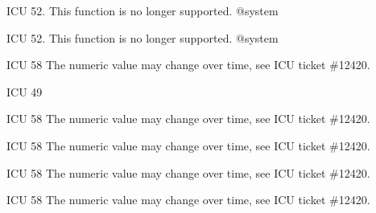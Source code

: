 \begin{DoxyRefList}
%
I\+CU 52. This function is no longer supported. @system  
\item[Member \mbox{\hyperlink{uclean_8h_af98d47f02b5ed1a25f662081076126c2}{u\+\_\+set\+Mutex\+Functions}} (const void $\ast$context, U\+Mtx\+Init\+Fn $\ast$init, U\+Mtx\+Fn $\ast$destroy, U\+Mtx\+Fn $\ast$lock, U\+Mtx\+Fn $\ast$unlock, U\+Error\+Code $\ast$status)]\label{deprecated__deprecated000035}%
%
I\+CU 52. This function is no longer supported. @system  
\item[Member \mbox{\hyperlink{utypes_8h_a3343c1c8a8377277046774691c98d78cac95be10a0360afc8388874d592bd4074}{U\+\_\+\+S\+T\+A\+N\+D\+A\+R\+D\+\_\+\+E\+R\+R\+O\+R\+\_\+\+L\+I\+M\+IT}} ]\label{deprecated__deprecated000232}%
%
I\+CU 58 The numeric value may change over time, see I\+CU ticket \#12420.  
\item[Member \mbox{\hyperlink{uchar_8h_a2ba37edcca62eff48226e8096035addfa3bbcfaa5c84064aab103a6201581736b}{U\+\_\+\+U\+N\+I\+C\+O\+D\+E\+\_\+10\+\_\+\+C\+H\+A\+R\+\_\+\+N\+A\+ME}} ]\label{deprecated__deprecated000020}%
%
I\+CU 49  
\item[Member \mbox{\hyperlink{uchar_8h_af70ee907368e663f8dd4b90c7196e15ca72f3d829d094754a620746892c46c717}{U\+\_\+\+W\+B\+\_\+\+C\+O\+U\+NT}} ]\label{deprecated__deprecated000027}%
%
I\+CU 58 The numeric value may change over time, see I\+CU ticket \#12420.  
\item[Member \mbox{\hyperlink{ubidi_8h_a88693e5a8ad4be974dc90ec6b8db56dfae19ca6f8614a91e49454b21264f6a379}{U\+B\+I\+D\+I\+\_\+\+R\+E\+O\+R\+D\+E\+R\+\_\+\+C\+O\+U\+NT}} ]\label{deprecated__deprecated000002}%
%
I\+CU 58 The numeric value may change over time, see I\+CU ticket \#12420.  
\item[Member \mbox{\hyperlink{uchar_8h_a19f1662c9c33c31593612d05777ea901a04e4577a8946c1c6b032ee1a17728eff}{U\+B\+L\+O\+C\+K\+\_\+\+C\+O\+U\+NT}} ]\label{deprecated__deprecated000018}%
%
I\+CU 58 The numeric value may change over time, see I\+CU ticket \#12420.  
\item[Member \mbox{\hyperlink{ubrk_8h_a026dec40289da8261d787daf3baa588ba6040742b07566e5e3655d4843efaefac}{U\+B\+R\+K\+\_\+\+C\+O\+U\+NT}} ]\label{deprecated__deprecated000006}%
%
I\+CU 58 The numeric value may change over time, see I\+CU ticket \#12420.  

\end{DoxyRefList}
